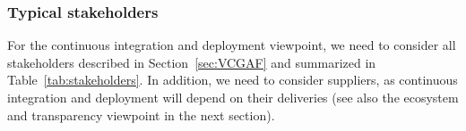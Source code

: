 

 


\subsubsection{Typical stakeholders} 

For the continuous integration and deployment viewpoint, we need to consider all stakeholders described in Section~\ref{sec:VCGAF} and summarized in Table~\ref{tab:stakeholders}.
In addition, we need to consider suppliers, as continuous integration and deployment will depend on their deliveries (see also the ecosystem and transparency viewpoint in the next section).

%
%
%
%
%
%
%
%
%
%


